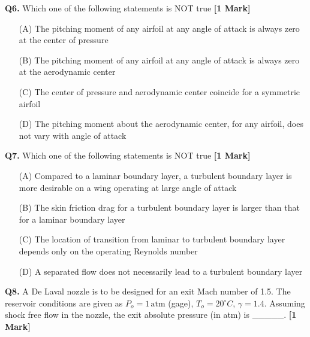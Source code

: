 \documentclass[11pt]{article}
\newcommand{\questiona}[2]{
    \noindent\textbf{Q#2.} #1 \hfill \textbf{[1 Mark]}
}
\begin{document}
\questiona{Which one of the following statements is NOT true}{6}
\begin{enumerate}
    \item[(A)] The pitching moment of any airfoil at any angle of attack is always zero at the center of pressure
    \item[(B)] The pitching moment of any airfoil at any angle of attack is always zero at the aerodynamic center
    \item[(C)] The center of pressure and aerodynamic center coincide for a symmetric airfoil
    \item[(D)] The pitching moment about the aerodynamic center, for any airfoil, does not vary with angle of attack
\end{enumerate}

\vspace{0.5cm}

\questiona{Which one of the following statements is NOT true}{7}
\begin{enumerate}
    \item[(A)] Compared to a laminar boundary layer, a turbulent boundary layer is more desirable on a wing operating at large angle of attack
    \item[(B)] The skin friction drag for a turbulent boundary layer is larger than that for a laminar boundary layer
    \item[(C)] The location of transition from laminar to turbulent boundary layer depends only on the operating Reynolds number
    \item[(D)] A separated flow does not necessarily lead to a turbulent boundary layer
\end{enumerate}

\vspace{0.5cm}

\questiona{A De Laval nozzle is to be designed for an exit Mach number of 1.5. The reservoir conditions are given as \( P_o = 1 \, \text{atm} \) (gage), \( T_o = 20^\circ C \), \( \gamma = 1.4 \). Assuming shock free flow in the nozzle, the exit absolute pressure (in atm) is \_\_\_\_\_.}{8}

\vspace{0.5cm}
\end{document}

